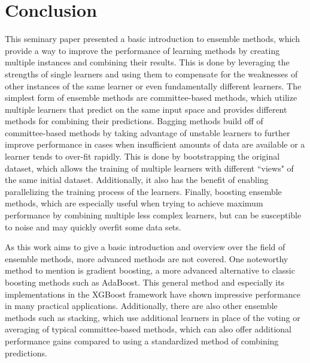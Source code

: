 

\section{Conclusion}

This seminary paper presented a basic introduction to ensemble methods, which provide a way to improve the performance of learning methods by creating multiple instances and combining their results. This is done by leveraging the strengths of single learners and using them to compensate for the weaknesses of other instances of the same learner or even fundamentally different learners. The simplest form of ensemble methods are committee-based methods, which utilize multiple learners that predict on the same input space and provides different methods for combining their predictions. Bagging methods build off of committee-based methods by taking advantage of unstable learners to further improve performance in cases when insufficient amounts of data are available or a learner tends to over-fit rapidly. This is done by bootstrapping the original dataset, which allows the training of multiple learners with different ``views" of the same initial dataset. Additionally, it also has the benefit of enabling parallelizing the training process of the learners. Finally, boosting ensemble methods, which are especially useful when trying to achieve maximum performance by combining multiple less complex learners, but can be susceptible to noise and may quickly overfit some data sets. \citep{Opitz.1999}

As this work aims to give a basic introduction and overview over the field of ensemble methods, more advanced methods are not covered. One noteworthy method to mention is gradient boosting, a more advanced alternative to classic boosting methods such as AdaBoost. This general method and especially its implementations in the XGBoost framework \citep{xgboost} have shown impressive performance in many practical applications. Additionally, there are also other ensemble methods such as stacking, which use additional learners in place of the voting or averaging of typical committee-based methods, which can also offer additional performance gains compared to using a standardized method of combining predictions.

\newpage